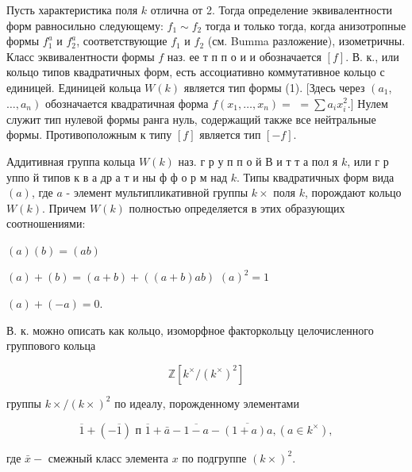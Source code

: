 \documentclass[10pt]{article}
\begin{document}
Пусть характеристика поля $k$ отлична от 2. Тогда определение эквивалентности форм равносильно следующему: $f_{1} \sim f_{2}$ тогда и только тогда, когда анизотропные формы $f_{1}^{a}$ и $f_{2}^{a}$, соответствующие $f_{1}$ и $f_{2}$ (см. Bumma разложение), изометричны. Класс эквивалентности формы $f$ наз. ее т п п о и и обозначается $[f]$. В. к., или кольцо типов квадратичных форм, есть ассоциативно коммутативное кольцо с единицей. Единицей кольца $W(k)$ является тип формы (1). [Здесь через $\left(a_{1}\right.$, $\left.\ldots, a_{n}\right)$ обозначается квадратичная форма $f\left(x_{1}, \ldots, x_{n}\right)=$ $=\sum a_{i} x_{i}^{2}$.] Нулем служит тип нулевой формы ранга нуль, содержащий также все нейтральные формы. Противоположным к типу $[f]$ является тип $[-f]$.



Аддитивная группа кольца $W(k)$ наз. г р у п п о й В и т т а пол я $k$, или г р уппо й типов к в а др а т и ны $\mathbf{ф}$ ф о р м над $k$. Типы квадратичных форм вида $(a)$, где $a$ - элемент мультипликативной группы $k \times$ поля $k$, порождают кольцо $W(k)$. Причем $W(k)$ полностью определяется в этих образующих соотношениями:



$(a)(b)=(a b)$



$(a)+(b)=(a+b)+((a+b) a b)$ $(a)^{2}=1$



$(a)+(-a)=0$.



В. к. можно описать как кольцо, изоморфное факторкольцу целочисленного группового кольца



\[

\mathbb{Z}\left[k^{\times} /\left(k^{\times}\right)^{2}\right]

\]



группы $k \times /(k \times)^{2}$ по идеалу, порожденному элементами



\[

\overline{1}+(-\overline{1}) \text { п } \overline{1}+\bar{a}-\overline{1-a}-\overline{(1+a) a},\left(a \in k^{\times}\right),

\]



где $\bar{x}-$ смежный класс элемента $x$ по подгруппе $(k \times)^{2}$.
\end{document}
